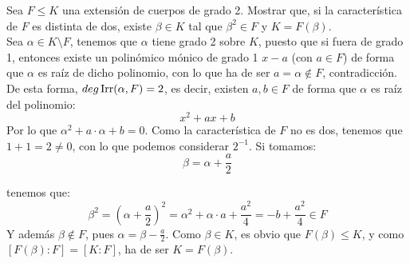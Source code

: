 \begin{ejercicio} 
    Sea $F\leq K$ una extensión de cuerpos de grado 2. Mostrar que, si la característica de $F$ es distinta de dos, existe $\beta\in K$ tal que $\beta^2 \in F$ y $K = F(\beta)$.\\

    \noindent
    Sea $\alpha\in K\setminus F$, tenemos que $\alpha$ tiene grado 2 sobre $K$, puesto que si fuera de grado 1, entonces existe un polinómico mónico de grado 1 $x-a$ (con $a\in F$) de forma que $\alpha$ es raíz de dicho polinomio, con lo que ha de ser $a = \alpha\notin F$, contradicción. De esta forma, $deg \operatorname{Irr}(\alpha,F)=2$, es decir, existen $a,b\in F$ de forma que $\alpha$ es raíz del polinomio:
    \begin{equation*}
        x^2+ax+b
    \end{equation*}
    Por lo que $\alpha^2 + a\cdot \alpha + b = 0$. Como la característica de $F$ no es dos, tenemos que $1+1 = 2 \neq 0$, con lo que podemos considerar $2^{-1}$. Si tomamos:
    \begin{equation*}
        \beta = \alpha + \frac{a}{2}
    \end{equation*}

    tenemos que:
    \begin{equation*}
        \beta^2 = {\left(\alpha+\frac{a}{2}\right)}^{2} = \alpha^2 + \alpha\cdot a + \frac{a^2}{4} = -b + \frac{a^{2}}{4} \in F
    \end{equation*}
    Y además $\beta\notin F$, pues $\alpha = \beta-\frac{a}{2}$. Como $\beta\in K$, es obvio que $F(\beta)\leq K$, y como $[F(\beta):F] = [K:F]$, ha de ser $K = F(\beta)$.
\end{ejercicio}

